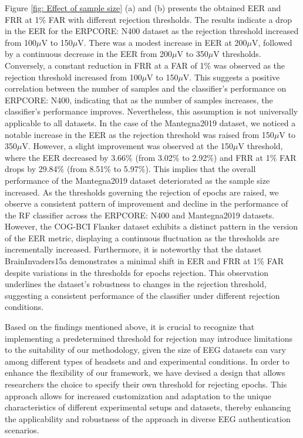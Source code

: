 Figure \ref{fig: Effect of sample size} (a) and (b) presents the obtained EER and FRR at 1$\%$ FAR with different rejection thresholds. The results indicate a drop in the EER for the ERPCORE: N400 dataset as the rejection threshold increased from 100$\mu$V to 150$\mu$V. There was a modest increase in EER at 200$\mu$V, followed by a continuous decrease in the EER from 200$\mu$V to 350$\mu$V thresholds. Conversely, a constant reduction in FRR at a FAR of 1$\%$ was observed as the rejection threshold increased from 100$\mu$V to 150$\mu$V. This suggests a positive correlation between the number of samples and the classifier's performance on ERPCORE: N400, indicating that as the number of samples increases, the classifier's performance improves.
Nevertheless, this assumption is not universally applicable to all datasets. In the case of the Mantegna2019 dataset, we noticed a notable increase in the EER as the rejection threshold was raised from 150$\mu$V to 350$\mu$V. However, a slight improvement was observed at the 150$\mu$V threshold, where the EER decreased by 3.66$\%$ (from 3.02$\%$ to 2.92$\%$) and FRR at 1$\%$ FAR drops by 29.84$\%$ (from 8.51$\%$ to 5.97$\%$). This implies that the overall performance of the Mantegna2019 dataset deteriorated as the sample size increased. As the thresholds governing the rejection of epochs are raised, we observe a consistent pattern of improvement and decline in the performance of the RF classifier across the ERPCORE: N400 and Mantegna2019 datasets. However, the COG-BCI Flanker dataset exhibits a distinct pattern in the version of the EER metric, displaying a continuous fluctuation as the thresholds are incrementally increased. Furthermore, it is noteworthy that the dataset BrainInvaders15a demonstrates a minimal shift in EER and FRR at 1$\%$ FAR despite variations in the thresholds for epochs rejection. This observation underlines the dataset's robustness to changes in the rejection threshold, suggesting a consistent performance of the classifier under different rejection conditions.  
\smallskip

Based on the findings mentioned above, it is crucial to recognize that implementing a predetermined threshold for rejection may introduce limitations to the suitability of our methodology, given the size of EEG datasets can vary among different types of headsets and and experimental conditions.
In order to enhance the flexibility of our framework, we have devised a design that allows researchers the choice to specify their own threshold for rejecting epochs. This approach allows for increased customization and adaptation to the unique characteristics of different experimental setups and datasets, thereby enhancing the applicability and robustness of the approach in diverse EEG authentication scenarios.

